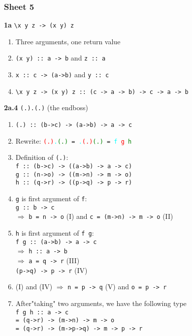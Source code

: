 \documentclass[12pt]{article}
\begin{document}
\subsubsection{Sheet 5}
\textbf{1a} \verb|\x y z -> (x y) z|
\begin{enumerate}
    \item Three arguments, one return value
    \item \verb|(x y) :: a -> b| and \verb|z :: a|
    \item \verb|x :: c -> (a->b)| and \verb|y :: c|
    \item \verb|\x y z -> (x y) z :: (c -> a -> b) -> c -> a -> b|
\end{enumerate}
\textbf{2a.4} \texttt{(.).(.)} (the endboss)
\begin{enumerate}
    \item \texttt{(.) :: (b->c) -> (a->b) -> a -> c}
    \item Rewrite: \texttt{\textcolor{Red}{(.)}\textcolor{Cyan}{.}\textcolor{Green}{(.)} 
    = \textcolor{Cyan}{.}\textcolor{Red}{(.)}\textcolor{Green}{(.)} 
    = \textcolor{Cyan}{f} \textcolor{Red}{g} \textcolor{Green}{h}}
    \item Definition of \texttt{(.)}: \\
    \texttt{f :: (b->c) -> ((a->b) -> a -> c)} \\
    \texttt{g :: (n->o) -> ((m->n) -> m -> o)} \\
    \texttt{h :: (q->r) -> ((p->q) -> p -> r)} 
    \item \texttt{g} is first argument of \texttt{f}: \\
    \texttt{g :: b -> c} \\
    $\Rightarrow$ \texttt{b = n -> o} (I) and
    \texttt{c = (m->n) -> m -> o} (II)
    \item \texttt{h} is first argument of \texttt{f g}:\\
    \texttt{f g :: (a->b) -> a -> c}   \\
    $\Rightarrow$ \texttt{h :: a -> b}  \\
    $\Rightarrow$ \texttt{a = q -> r} (III)\\
    \texttt{(p->q) -> p -> r} (IV)
    \item (I) and (IV) $\Rightarrow$ 
    \texttt{n = p -> q} (V) and \texttt{o = p -> r}
    \item After"taking" two arguments, we have the following type \\
    \texttt{f g h :: a -> c} \\
    \texttt{= (q->r) -> (m->n) -> m -> o} \\
    \texttt{= (q->r) -> (m->p->q) -> m -> p -> r }
    
    
    
\end{enumerate}
\end{document}
